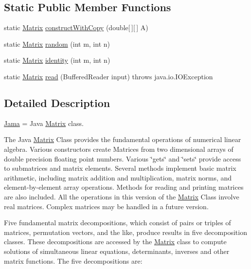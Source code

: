 \subsection*{Static Public Member Functions}
\begin{DoxyCompactItemize}
\item 
static \hyperlink{class_jama_1_1_matrix}{Matrix} \hyperlink{class_jama_1_1_matrix_ad900a4fa94f188bd56f4f89a20f30f0c}{construct\+With\+Copy} (double\mbox{[}$\,$\mbox{]}\mbox{[}$\,$\mbox{]} A)
\item 
static \hyperlink{class_jama_1_1_matrix}{Matrix} \hyperlink{class_jama_1_1_matrix_abada6fa5511a4743b70ef4e4fc17e62b}{random} (int m, int n)
\item 
static \hyperlink{class_jama_1_1_matrix}{Matrix} \hyperlink{class_jama_1_1_matrix_aa137f0aa3f5b03e9da21cbf2981e3c20}{identity} (int m, int n)
\item 
static \hyperlink{class_jama_1_1_matrix}{Matrix} \hyperlink{class_jama_1_1_matrix_aa5cf5916ae60b1f6144853b7190ee624}{read} (Buffered\+Reader input)  throws java.\+io.\+I\+O\+Exception 
\end{DoxyCompactItemize}


\subsection{Detailed Description}
\hyperlink{namespace_jama}{Jama} = Java \hyperlink{class_jama_1_1_matrix}{Matrix} class. 

The Java \hyperlink{class_jama_1_1_matrix}{Matrix} Class provides the fundamental operations of numerical linear algebra. Various constructors create Matrices from two dimensional arrays of double precision floating point numbers. Various \char`\"{}gets\char`\"{} and \char`\"{}sets\char`\"{} provide access to submatrices and matrix elements. Several methods implement basic matrix arithmetic, including matrix addition and multiplication, matrix norms, and element-\/by-\/element array operations. Methods for reading and printing matrices are also included. All the operations in this version of the \hyperlink{class_jama_1_1_matrix}{Matrix} Class involve real matrices. Complex matrices may be handled in a future version. 

Five fundamental matrix decompositions, which consist of pairs or triples of matrices, permutation vectors, and the like, produce results in five decomposition classes. These decompositions are accessed by the \hyperlink{class_jama_1_1_matrix}{Matrix} class to compute solutions of simultaneous linear equations, determinants, inverses and other matrix functions. The five decompositions are\+: 


